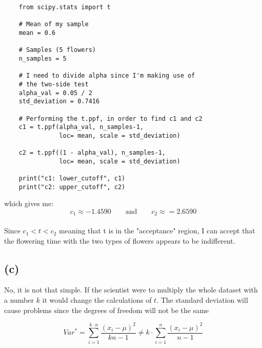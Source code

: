 \begin{verbatim}
    from scipy.stats import t

    # Mean of my sample
    mean = 0.6

    # Samples (5 flowers)
    n_samples = 5

    # I need to divide alpha since I'm making use of
    # the two-side test
    alpha_val = 0.05 / 2
    std_deviation = 0.7416

    # Performing the t.ppf, in order to find c1 and c2 
    c1 = t.ppf(alpha_val, n_samples-1,
               loc= mean, scale = std_deviation)

    c2 = t.ppf((1 - alpha_val), n_samples-1, 
               loc= mean, scale = std_deviation)

    print("c1: lower_cutoff", c1)
    print("c2: upper_cutoff", c2)
\end{verbatim}

\noindent which gives me:
$$c_1 \approx -1.4590 \quad \quad \text{and} \quad \quad c_2 \approx = 2.6590 $$
\\
Since $c_1 < t < c_2 $ meaning that t is in the "acceptance" region, I can accept that 
the flowering time with the two types of flowers appears to be indifferent.

\subsection{(c)}
No, it is not that simple. If the scientist were to multiply the whole dataset with
a number $ k $ it would change the calculations of $ t $.
The standard deviation will cause problems since the degrees of freedom will not be the same

$$ Var^* = \sum_{i = 1}^{k \cdot n} \frac{(x_i - \mu)^2}{kn-1} \neq k \cdot \sum_{i = 1}^{ n} \frac{(x_i - \mu)^2}{n-1}$$
